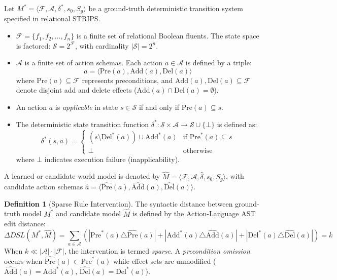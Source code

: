 \documentclass[11pt,a4paper]{article}
\theoremstyle{definition}
\newtheorem{definition}[theorem]{Definition}
\theoremstyle{remark}
\begin{document}
Let $M^* = \langle \mathcal{F}, \mathcal{A}, \delta^*, s_0, S_g \rangle$ be a ground-truth deterministic transition system specified in relational STRIPS.
\begin{itemize}
    \item $\mathcal{F} = \{f_1, f_2, \dots, f_n\}$ is a finite set of relational Boolean fluents. The state space is factored: $\mathcal{S} = 2^\mathcal{F}$, with cardinality $|\mathcal{S}| = 2^n$.
    \item $\mathcal{A}$ is a finite set of action schemas. Each action $a \in \mathcal{A}$ is defined by a triple:
    \begin{equation}
        a = \langle \text{Pre}(a), \text{Add}(a), \text{Del}(a) \rangle
    \end{equation}
    where $\text{Pre}(a) \subseteq \mathcal{F}$ represents preconditions, and $\text{Add}(a), \text{Del}(a) \subseteq \mathcal{F}$ denote disjoint add and delete effects ($\text{Add}(a) \cap \text{Del}(a) = \emptyset$).
    \item An action $a$ is \emph{applicable} in state $s \in \mathcal{S}$ if and only if $\text{Pre}(a) \subseteq s$.
    \item The deterministic state transition function $\delta^*: \mathcal{S} \times \mathcal{A} \to \mathcal{S} \cup \{\bot\}$ is defined as:
    \begin{equation}
        \delta^*(s, a) = \begin{cases}
            (s \setminus \text{Del}^*(a)) \cup \text{Add}^*(a) & \text{if } \text{Pre}^*(a) \subseteq s \\
            \bot & \text{otherwise}
        \end{cases}
    \end{equation}
    where $\bot$ indicates execution failure (inapplicability).
\end{itemize}

A learned or candidate world model is denoted by $\widehat{M} = \langle \mathcal{F}, \mathcal{A}, \widehat{\delta}, s_0, S_g \rangle$, with candidate action schemas $\widehat{a} = \langle \widehat{\text{Pre}}(a), \widehat{\text{Add}}(a), \widehat{\text{Del}}(a) \rangle$.

\begin{definition}[Sparse Rule Intervention]
The syntactic distance between ground-truth model $M^*$ and candidate model $\widehat{M}$ is defined by the Action-Language AST edit distance:
\begin{equation}
    \Delta DSL(M^*, \widehat{M}) = \sum_{a \in \mathcal{A}} \left( |\text{Pre}^*(a) \triangle \widehat{\text{Pre}}(a)| + |\text{Add}^*(a) \triangle \widehat{\text{Add}}(a)| + |\text{Del}^*(a) \triangle \widehat{\text{Del}}(a)| \right) = k
\end{equation}
When $k \ll |\mathcal{A}| \cdot |\mathcal{F}|$, the intervention is termed \emph{sparse}. A \emph{precondition omission} occurs when $\widehat{\text{Pre}}(a) \subset \text{Pre}^*(a)$ while effect sets are unmodified ($\widehat{\text{Add}}(a) = \text{Add}^*(a)$, $\widehat{\text{Del}}(a) = \text{Del}^*(a)$).
\end{definition}
\end{document}
